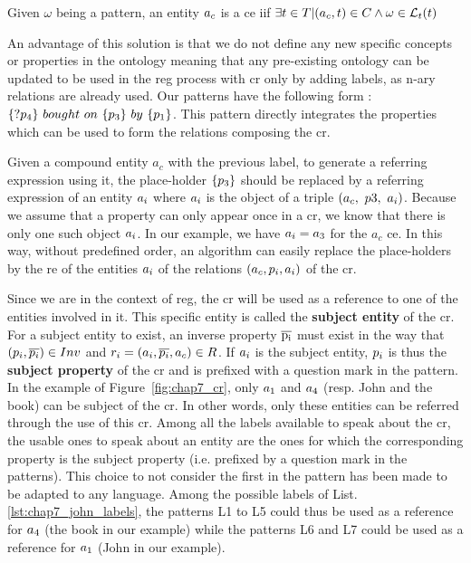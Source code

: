 \begin{theorem} 
\label{the:compound_entity}
Given $\omega$ being a pattern, an entity $a_c$ is a \acrlong{ce} iif $\exists t \in T | (a_c, t) \in C \land \omega \in \mathcal{L}_t{(t)}$
\end{theorem}

An advantage of this solution is that we do not define any new specific concepts or properties in the ontology meaning that any pre-existing ontology can be updated to be used in the \acrshort{reg} process with \acrshort{cr} only by adding labels, as n-ary relations are already used. Our patterns have the following form : $\{?\property_4\}\ bought\ on\ \{\property_3\}\ by\ \{\property_1\}$. This pattern directly integrates the properties which can be used to form the relations composing the \acrshort{cr}.

Given a compound entity $a_c$ with the previous label, to generate a referring expression using it, the place-holder $\{p_3\}$ should be replaced by a referring expression of an entity $a_i$ where $a_i$ is the object of a triple $(a_c,\ p3,\ a_i)$. Because we assume that a property can only appear once in a \acrshort{cr}, we know that there is only one such object $a_i$. In our example, we have $a_i = a_3$ for the $a_c$ \acrshort{ce}.
In this way, without predefined order, an algorithm can easily replace the place-holders by the \acrshort{re} of the entities $a_i$ of the relations $(a_c, p_i, a_i)$ of the \acrshort{cr}.

Since we are in the context of \acrshort{reg}, the \acrshort{cr} will be used as a reference to one of the entities involved in it. This specific entity is called the \textbf{subject entity} of the \acrshort{cr}. 
For a subject entity to exist, an inverse property $\overline{\rm p_i}$ must exist in the way that $(p_i, \overline{p_i}) \in Inv$ and $r_i = (a_i, \overline{p_i}, a_c) \in R$. If $a_i$ is the subject entity, $p_i$ is thus the \textbf{subject property} of the \acrshort{cr} and is prefixed with a question mark in the pattern. In the example of Figure~\ref{fig:chap7_cr}, only $a_1$ and $a_4$ (resp. John and the book) can be subject of the \acrshort{cr}. In other words, only these entities can be referred through the use of this \acrshort{cr}. Among all the labels available to speak about the \acrshort{cr}, the usable ones to speak about an entity are the ones for which the corresponding property is the subject property (i.e. prefixed by a question mark in the patterns). This choice to not consider the first in the pattern has been made to be adapted to any language. Among the possible labels of List.\ref{lst:chap7_john_labels}, the patterns L1 to L5 could thus be used as a reference for $a_4$ (the book in our example) while the patterns L6 and L7 could be used as a reference for $a_1$ (John in our example).

